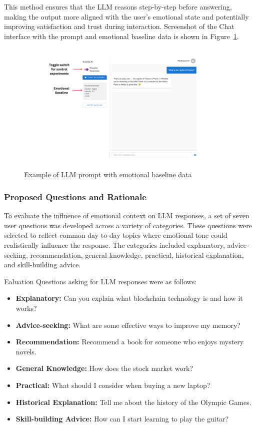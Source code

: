 \par This method ensures that the LLM reasons step-by-step before answering, making the output more aligned with the user's emotional state and potentially improving satisfaction and trust during interaction. Screenshot of the Chat interface with the prompt and emotional baseline data is shown in Figure~\ref{fig:llm_prompt}.


\begin{figure}[H]
    \centering
    \includegraphics[width=1.2\textwidth]{img/chapter_03/llm-ui.png}
    \caption{Example of LLM prompt with emotional baseline data}
    \label{fig:llm_prompt}
\end{figure}


\subsubsection*{Proposed Questions and Rationale}
\label{sec:questions-rationale}
\par To evaluate the influence of emotional context on LLM responses, a set of seven user questions was developed across a variety of categories. These questions were selected to reflect common day-to-day topics where emotional tone could realistically influence the response. The categories included explanatory, advice-seeking, recommendation, general knowledge, practical, historical explanation, and skill-building advice.

\par Ealuation Questions asking for LLM responses were as follows:
\begin{itemize}
    \item \textbf{Explanatory:} Can you explain what blockchain technology is and how it works?
    \item \textbf{Advice-seeking:} What are some effective ways to improve my memory?
    \item \textbf{Recommendation:} Recommend a book for someone who enjoys mystery novels.
    \item \textbf{General Knowledge:} How does the stock market work?
    \item \textbf{Practical:} What should I consider when buying a new laptop?
    \item \textbf{Historical Explanation:} Tell me about the history of the Olympic Games.
    \item \textbf{Skill-building Advice:} How can I start learning to play the guitar?
\end{itemize}

